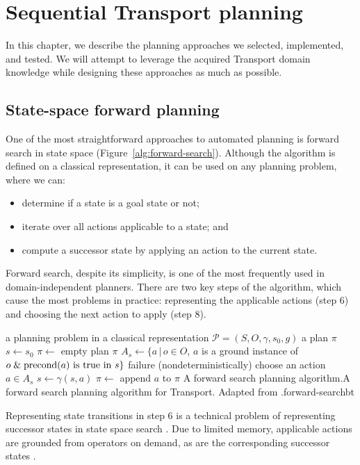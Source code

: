 \chapter{Sequential Transport planning}

In this chapter, we describe the planning approaches we
selected, implemented, and tested.
We will attempt to leverage the acquired
Transport domain knowledge
while designing these approaches as much as possible.

\section{State-space forward planning}\label{forward-planning}

One of the most straightforward approaches to automated planning
is forward search \citep[Section~4.2]{Ghallab2004}
in state space (Figure~\ref{alg:forward-search}).
Although the algorithm is defined on a classical representation,
it can be used on any planning problem, where we can:
\begin{itemize}
\item determine if a state is a goal state or not;
\item iterate over all actions applicable to a state; and
\item compute a successor state by applying an action to the current state.
\end{itemize}
Forward search, despite its simplicity, is one of the most frequently
used in domain-independent planners.
There are two key steps of the algorithm, which
cause the most problems in practice: representing
the applicable actions (step 6) and choosing the
next action to apply (step 8).

%
{%
\Input a planning problem in a classical representation $\mathcal{P} = (S, O, \gamma, s_0, g)$
\Output a plan $\pi$
\State $s \gets s_0$ 
\State $\pi \gets $ empty plan
\Loop
{} \Return $\pi$ \EndIf
\State $A_s \gets \{a \,|\, o \in O$, $a$ is a ground instance of $o \;\&\; \textrm{precond}(a) \textrm{ is true in } s\}$
 \Return failure \EndIf
\State (nondeterministically) choose an action $a \in A_s$
\State $s \gets \gamma(s, a)$
\State $\pi \gets$ append $a$ to $\pi$
\EndLoop
\EndFunction
}%
{A forward search planning algorithm.}{A forward search planning algorithm for Transport. Adapted from \citet[Figure~4.1]{Ghallab2004}.}{forward-search}{bt}

Representing state transitions in step 6
is a technical problem of representing successor states
in state space search \citep[Section~3.2]{Russell1995}.
Due to limited memory,
applicable actions are grounded from operators
on demand, as are the corresponding successor states
\citep[Section~3.4]{Russell1995}.

